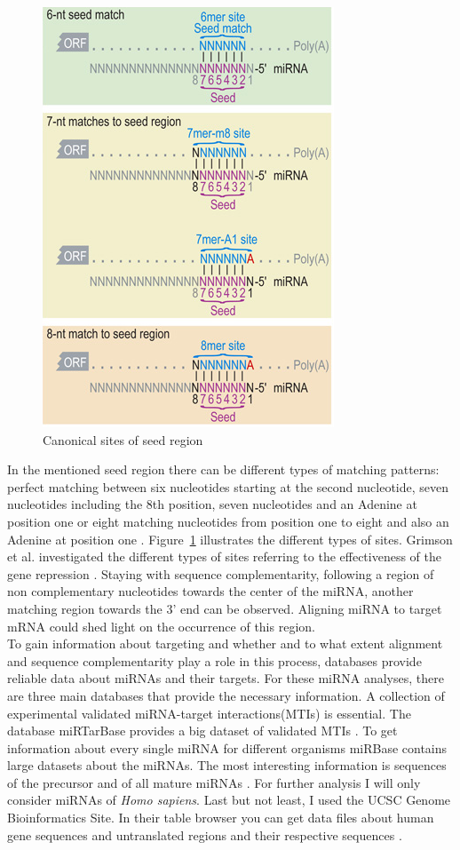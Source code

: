 \documentclass[11pt,  a4paper]{report}
\begin{document}
\begin{figure}
\centering
\includegraphics[scale=0.6]{results/canonical_sites.png}
\caption{Canonical sites of seed region}
\label{Fig:canonical}
\end{figure}


In the mentioned seed region there can be different types of matching patterns: perfect matching between six nucleotides starting at the second nucleotide, seven nucleotides including the 8th position, seven nucleotides and an Adenine at position one or eight matching nucleotides from position one to eight and also an Adenine at position one \cite{Grimson}. Figure~\ref{Fig:canonical} illustrates the different types of sites. Grimson et al. investigated the different types of sites referring to the effectiveness of the gene repression \cite{Grimson}. Staying with sequence complementarity, following a region of non complementary nucleotides towards the center of the miRNA, another matching region towards the 3' end can be observed. Aligning miRNA to target mRNA could shed light on the occurrence of this region.  \\



To gain information about targeting and whether and to what extent alignment and sequence complementarity play a role in this process, databases provide reliable data about miRNAs and their targets. 
For these miRNA analyses, there are three main databases that provide the necessary information. A collection of experimental validated miRNA-target interactions(MTIs) is essential. The database miRTarBase provides a big dataset of validated MTIs \cite{Hsu}. To get information about every single miRNA for different organisms miRBase contains large datasets about the miRNAs. The most interesting information is sequences of the precursor and of all mature miRNAs \cite{mirbase}. For further analysis I will only consider miRNAs of \textit{Homo sapiens}. Last but not least, I used the UCSC Genome Bioinformatics Site. In their table browser you can get data files about human gene sequences and untranslated regions and their respective sequences \cite{ucsc}.
  
\end{document}
